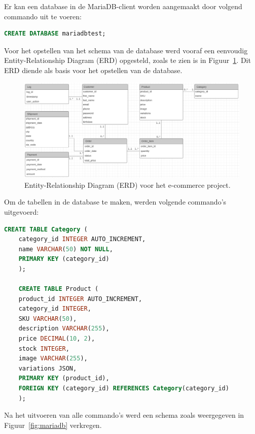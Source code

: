 Er kan een database in de MariaDB-client worden aangemaakt door volgend commando uit te voeren:

\begin{lstlisting}[language=SQL, caption={SQL-query voor het aanmaken van de database.}]
    CREATE DATABASE mariadbtest;
\end{lstlisting}

Voor het opstellen van het schema van de database werd vooraf een eenvoudig Entity-Relationship Diagram (ERD) opgesteld, zoals te zien is in Figuur~\ref{fig:erd-e-commerce}. Dit ERD diende als basis voor het opstellen van de database.

\begin{figure}[H]
    \centering
    \includegraphics[width=\linewidth]{graphics/erd-e-commerce}
    \caption[Entity-Relationship Diagram (ERD) voor het e-commerce project.]{Entity-Relationship Diagram (ERD) voor het e-commerce project.}
    \label{fig:erd-e-commerce}
\end{figure}

Om de tabellen in de database te maken, werden volgende commando's uitgevoerd:

\begin{lstlisting}[language=SQL, caption={SQL-queries voor het aanmaken van de categorie en product tabel in de database.}]
    CREATE TABLE Category (
    category_id INTEGER AUTO_INCREMENT,
    name VARCHAR(50) NOT NULL,
    PRIMARY KEY (category_id)
    );
    
    CREATE TABLE Product (
    product_id INTEGER AUTO_INCREMENT,
    category_id INTEGER,
    SKU VARCHAR(50),
    description VARCHAR(255),
    price DECIMAL(10, 2),
    stock INTEGER,
    image VARCHAR(255),
    variations JSON,
    PRIMARY KEY (product_id),
    FOREIGN KEY (category_id) REFERENCES Category(category_id)
    );
\end{lstlisting}

Na het uitvoeren van alle commando's werd een schema zoals weergegeven in Figuur~\ref{fig:mariadb} verkregen.

